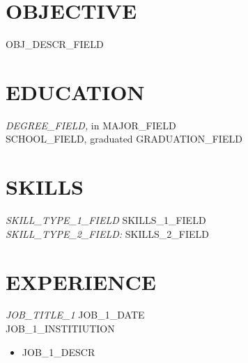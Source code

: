\documentclass[margin, 10pt]{res} %
\begin{document}
\begin{resume}

 
\section{OBJECTIVE}  

OBJ_DESCR_FIELD


\section{EDUCATION}

{\sl DEGREE_FIELD,} in MAJOR_FIELD \\
SCHOOL_FIELD, graduated GRADUATION_FIELD \\
 

\section{SKILLS} 

{\sl SKILL_TYPE_1_FIELD} 
SKILLS_1_FIELD \\
{\sl SKILL_TYPE_2_FIELD:} SKILLS_2_FIELD
 
 
\section{EXPERIENCE}

{\sl JOB_TITLE_1} \hfill JOB_1_DATE \\
JOB_1_INSTITIUTION
\begin{itemize} \itemsep -2pt %
\item JOB_1_DESCR
\end{itemize}
 

\end{resume}
\end{document}
